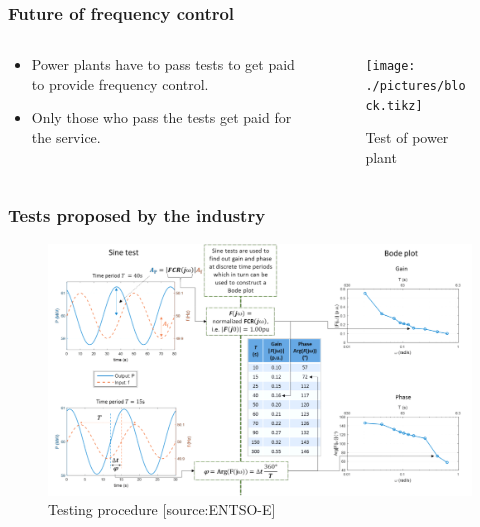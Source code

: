 \begin{frame}
\frametitle{Future of frequency control}
\begin{columns}
\begin{column}{0.4\textwidth}
		\begin{itemize}
		\item Power plants have to pass tests to get paid to provide frequency control.
		\item Only those who pass the tests get paid for the service.
	\end{itemize}
\end{column}
\begin{column}{0.6\textwidth}
	\begin{figure}
		\texttt{[image: ./pictures/block.tikz]}
		\caption{Test of power plant}
	\end{figure}
\end{column}
\end{columns}
\end{frame}
\begin{frame}
		\frametitle{Tests proposed by the industry}
		\begin{figure}
				\includegraphics[width=\textwidth]{./pictures/tests.png}
				\caption{Testing procedure [source:ENTSO-E]}
		\end{figure}
\end{frame}
